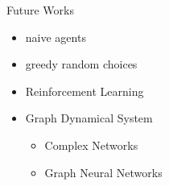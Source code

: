\begin{frame}{Future Works}
\begin{itemize}
    \item naive agents
    \item greedy random choices
\end{itemize}
\bigskip
{}
\begin{itemize}
    \item Reinforcement Learning
    \item Graph Dynamical System
    \begin{itemize}
        \item Complex Networks
        \item Graph Neural Networks
    \end{itemize}
\end{itemize}
\end{frame}
